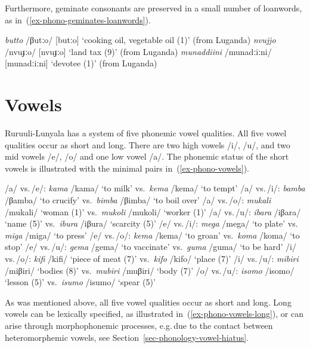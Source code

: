 Furthermore, geminate consonants are preserved in a small number of loanwords, as in~(\ref{ex-phono-geminates-loanwords}).
\ea \label{ex-phono-geminates-loanwords}
\begin{xlist}	
	\ex  \textit{butto} /βutːo/ [butːo] `cooking oil, vegetable oil (1)' (from Luganda)
	\ex  \textit{nvujjo} /nvuɟːo/ [nvuɟːo] `land tax (9)' (from Luganda)
	\ex  \textit{munaddiini} /munadːiːni/ [munadːiːni] `devotee (1)' (from Luganda)
\end{xlist}	
\z

\section{Vowels}\label{sec-phonology-vowels}
Ruruuli-Lunyala has a system of five phonemic vowel qualities. 
All five vowel qualities occur as short and long. 
There are two high vowels /i/, /u/, and two mid vowels /e/, /o/ and one low vowel /a/.  
The phonemic status of the short vowels is illustrated with the minimal pairs in~(\ref{ex-phono-vowels}).

\ea \label{ex-phono-vowels}
\begin{xlist}	
	\ex /a/ vs.\,/e/:  \textit{kama} /kama/ ‘to milk’ 		vs.\, \textit{kema}  /kema/ ‘to tempt’
	\ex /a/ vs.\,/i/:   \textit{bamba} /βamba/ ‘to crucify’ 	vs.\, \textit{bimba} /βimba/ ‘to boil over’
	\ex /a/ vs.\,/o/:   \textit{mukali} /mukali/  ‘woman (1)’ 	vs.\, \textit{mukoli}  /mukoli/ ‘worker (1)’
	\ex /a/ vs.\,/u/:  \textit{ibara} /iβara/  ‘name (5)’		 vs.\, \textit{ibura} /iβura/  ‘scarcity (5)’ 
	\ex /e/ vs.\,/i/:   \textit{mega} /mega/	 ‘to plate’ 		vs.\, \textit{miga} /miga/  ‘to press’ 
	\ex /e/ vs.\,/o/:   \textit{kema} /kema/ ‘to groan’ 		vs.\, \textit{koma} /koma/  ‘to stop'
	\ex /e/ vs.\,/u/:   \textit{gema} /gema/ ‘to vaccinate’ 	vs.\,  \textit{guma} /guma/ ‘to be hard’
	\ex /i/ vs.\,/o/:  \textit{kifi} /kifi/ ‘piece of meat (7)’ 	 vs.\, \textit{kifo} /kifo/  ‘place (7)’
	\ex /i/ vs.\,/u/:  \textit{mibiri} /miβiri/ 	‘bodies (8)’ vs.\, \textit{mubiri} /muβiri/  ‘body (7)’
	\ex /o/ vs.\,/u/:   \textit{isomo} /isomo/ ‘lesson (5)’ 	vs.\, \textit{isumo}  /isumo/ ‘spear (5)’
\end{xlist}	
\z

As was mentioned above, all five vowel qualities occur as short and long. 
Long vowels can be lexically specified, as illustrated in~(\ref{ex-phono-vowels-long}), or can arise through morphophonemic processes, e.g.\,due to the contact between heteromorphemic vowels, see Section~\ref{sec-phonology-vowel-hiatus}. 

